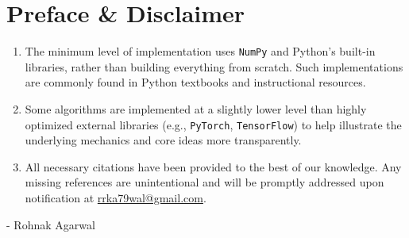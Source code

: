 \chapter*{Preface \& Disclaimer}

\begin{enumerate}[itemsep=0.3cm]
    \item The minimum level of implementation uses \texttt{NumPy} and Python’s built-in libraries, rather than building everything from scratch. Such implementations are commonly found in Python textbooks and instructional resources.

    \item Some algorithms are implemented at a slightly lower level than highly optimized external libraries (e.g., \texttt{PyTorch}, \texttt{TensorFlow}) to help illustrate the underlying mechanics and core ideas more transparently.

    \item All necessary citations have been provided to the best of our knowledge. Any missing references are unintentional and will be promptly addressed upon notification at \href{mailto:rrka79wal@gmail.com}{rrka79wal@gmail.com}.
    
\end{enumerate}

\vspace{1cm}

- Rohnak Agarwal










